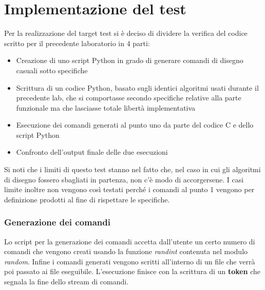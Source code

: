 \documentclass{article}
\begin{document}
\section{Implementazione del test}
	Per la realizzazione del target test si è deciso di dividere la verifica del codice scritto per il precedente laboratorio 
	in 4 parti:
	\begin{itemize}
		\item Creazione di uno script Python in grado di generare comandi di disegno casuali sotto specifiche
		\item Scrittura di un codice Python, basato sugli identici algoritmi usati durante il precedente lab, che si comportasse secondo specifiche relative alla parte funzionale ma che lasciasse totale libertà implementativa
		\item Esecuzione dei comandi generati al punto uno da parte del codice C e dello script Python
		\item Confronto dell'output finale delle due esecuzioni
	\end{itemize}
	Si noti che i limiti di questo test stanno nel fatto che, nel caso in cui gli algoritmi di disegno fossero sbagliati in 
	partenza, non c'è modo di accorgersene. I casi limite inoltre non vengono così testati perché i comandi al punto 1 vengono 
	per definizione prodotti al fine di rispettare le specifiche.

	\subsubsection*{Generazione dei comandi}
		Lo script per la generazione dei comandi accetta dall'utente un certo numero di comandi che vengono creati usando la funzione \textit{randint} contenuta nel modulo \textit{random}. Infine i comandi generati vengono scritti all'interno di un file che verrà poi passato ai file eseguibile.
		L'esecuzione finisce con la scrittura di un \textbf{token} che segnala la fine dello stream di comandi.
\end{document}
